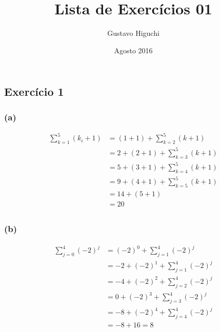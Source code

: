 \documentclass{article}
\title{Lista de Exercícios 01}
\author{Gustavo Higuchi}
\date{Agosto 2016}
\begin{document}
\maketitle

\tableofcontents
\newpage


\chapter{}
\section{Exercício 1}
\subsection*{(a)}

\begin{equation} \label{eq1}
\begin{split}
\sum\limits_{k=1}^{5}(k_i + 1) & =  (1 + 1) + \sum\limits_{k=2}^{5}(k + 1) \\
& =  2 + (2 + 1) + \sum\limits_{k=3}^{5}(k + 1) \\
& =  5 + (3 + 1) + \sum\limits_{k=4}^{5}(k + 1) \\
& =  9 + (4 + 1) + \sum\limits_{k=5}^{5}(k + 1) \\
& =  14 + (5 + 1)  \\
& =  20  \\
\end{split}
\end{equation}

\subsection*{(b)}
\begin{equation} \label{eq2}
\begin{split}
\sum\limits_{j=0}^{4}(-2)^j & =  (-2)^0 + \sum\limits_{j=1}^{4}(-2)^j \\
& =  -2 + (-2)^1 + \sum\limits_{j=1}^{4}(-2)^j \\
& =  -4 + (-2)^2 + \sum\limits_{j=2}^{4}(-2)^j \\
& =  0 + (-2)^3 + \sum\limits_{j=3}^{4}(-2)^j \\
& =  -8 + (-2)^4 + \sum\limits_{j=4}^{4}(-2)^j \\
& = -8 + 16 = 8\\
\end{split}
\end{equation}
\end{document}
